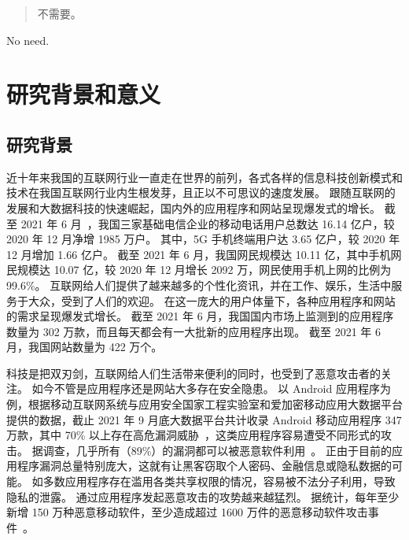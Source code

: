 \documentclass[degree=master,cjk-font=noto]{thuthesis}
\begin{document}
\maketitle

\frontmatter
\begin{abstract}
  不需要。

\end{abstract}

\begin{abstract*}
  No need.

\end{abstract*}


\tableofcontents

\listoffiguresandtables

\mainmatter

\chapter{研究背景和意义}

\section{研究背景}

近十年来我国的互联网行业一直走在世界的前列，各式各样的信息科技创新模式和技术在我国互联网行业内生根发芽，且正以不可思议的速度发展。
跟随互联网的发展和大数据科技的快速崛起，国内外的应用程序和网站呈现爆发式的增长。
截至 2021 年 6 月~\cite{CNNIC-report}，我国三家基础电信企业的移动电话用户总数达 16.14 亿户，较 2020 年 12 月净增 1985 万户。
其中，5G 手机终端用户达 3.65 亿户，较 2020 年 12 月增加 1.66 亿户。
截至 2021 年 6 月，我国网民规模达 10.11 亿，其中手机网民规模达 10.07 亿，较 2020 年 12 月增长 2092 万，网民使用手机上网的比例为 99.6\%。
互联网给人们提供了越来越多的个性化资讯，并在工作、娱乐，生活中服务于大众，受到了人们的欢迎。
在这一庞大的用户体量下，各种应用程序和网站的需求呈现爆发式增长。
截至 2021 年 6 月，我国国内市场上监测到的应用程序数量为 302 万款，而且每天都会有一大批新的应用程序出现。
截至 2021 年 6 月，我国网站数量为 422 万个。

科技是把双刃剑，互联网给人们生活带来便利的同时，也受到了恶意攻击者的关注。
如今不管是应用程序还是网站大多存在安全隐患。
以 Android 应用程序为例，根据移动互联网系统与应用安全国家工程实验室和爱加密移动应用大数据平台提供的数据，截止 2021 年 9 月底大数据平台共计收录 Android 移动应用程序 347 万款，其中 70\% 以上存在高危漏洞威胁~\cite{App-report}，这类应用程序容易遭受不同形式的攻击。
据调查，几乎所有（89\%）的漏洞都可以被恶意软件利用~\cite{ZOL-report}。
正由于目前的应用程序漏洞总量特别庞大，这就有让黑客窃取个人密码、金融信息或隐私数据的可能。
如多数应用程序存在滥用各类共享权限的情况，容易被不法分子利用，导致隐私的泄露。
通过应用程序发起恶意攻击的攻势越来越猛烈。
据统计，每年至少新增 150 万种恶意移动软件，至少造成超过 1600 万件的恶意移动软件攻击事件~\cite{Attack-report}。
\end{document}
